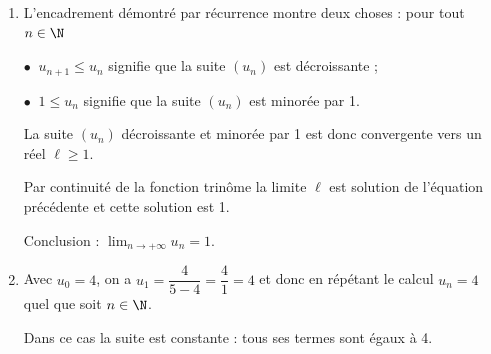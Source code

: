 \begin{enumerate}
\begin{enumerate}
		Les racines de cette équation 1 et 4 sont évidentes (sinon on calcule le déterminant), donc :

$x^2 - 5x + 4 = 0 \iff (x - 1)( x - 4) = 0 \iff \left\{\begin{array}{l c l}
x - 1			&=&0\\
				&\text{ou}&\\
x - 4			&=&0
\end{array}\right. \iff \left\{\begin{array}{l c l}
x 	&=			&1\\
	&\text{ou}	&\\
x 	&=			& 4
\end{array}\right.$

la solution 4 n'est pas vraisemblable puisque $x < 4$, on a donc $S = \{1\}$.
	\end{enumerate}	
\item 


L'encadrement démontré par récurrence montre deux choses : pour tout $n \in \N$

$\bullet~$ $u_{n+1} \leqslant u_n$ signifie que la suite $\left(u_n\right)$ est décroissante ;

$\bullet~$ $1\leqslant u_n$ signifie que la suite $\left(u_n\right)$ est minorée par 1.

La suite $\left(u_n\right)$ décroissante et minorée par 1 est donc convergente vers un réel $\ell \geqslant 1$.

Par continuité de la fonction trinôme la limite $\ell$ est solution de l'équation précédente et cette solution est 1.

Conclusion : $\displaystyle\lim_{n \to + \infty} u_n = 1$.
\item 
Avec $u_0 = 4$, on a $u_1 = \dfrac{4}{5 - 4} =\dfrac41 = 4$ et donc en répétant le calcul $u_n = 4$ quel que soit $n \in \N$.

Dans ce cas la suite est constante : tous ses termes sont égaux à 4.
\end{enumerate}
